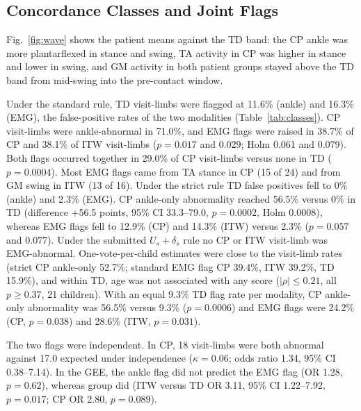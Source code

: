 \documentclass[conference]{IEEEtran}
\newcommand{\rtwo}[1]{{\color{rII}#1}}
\newcommand{\rthree}[1]{{\color{rIII}#1}}
\newcommand{\rfour}[1]{{\color{rIV}#1}}
\newcommand{\rtwo}[1]{#1}
\newcommand{\rthree}[1]{#1}
\newcommand{\rfour}[1]{#1}
\begin{document}
\subsection{Concordance Classes and Joint Flags}
\rtwo{Fig.~\ref{fig:wave} shows the patient means against the TD band: the CP ankle was more plantarflexed in stance and swing, TA activity in CP was higher in stance and lower in swing, and GM activity in both patient groups stayed above the TD band from mid-swing into the pre-contact window.}

\rfour{Under the standard rule, TD visit-limbs were flagged at 11.6\% (ankle) and 16.3\% (EMG), the false-positive rates of the two modalities (Table~\ref{tab:classes}).} \rtwo{CP visit-limbs were ankle-abnormal in 71.0\%, and EMG flags were raised in 38.7\% of CP and 38.1\% of ITW visit-limbs ($p=0.017$ and $0.029$; Holm 0.061 and 0.079). Both flags occurred together in 29.0\% of CP visit-limbs versus none in TD ($p=0.0004$). Most EMG flags came from TA stance in CP (15 of 24) and from GM swing in ITW (13 of 16).} \rthree{Under the strict rule TD false positives fell to 0\% (ankle) and 2.3\% (EMG).} CP ankle-only abnormality reached 56.5\% versus 0\% in TD (difference +56.5 points, 95\% CI 33.3--79.0, $p=0.0002$, Holm 0.0008), whereas EMG flags fell to 12.9\% (CP) and 14.3\% (ITW) versus 2.3\% ($p=0.057$ and $0.077$). \rtwo{Under the submitted $U_s+\delta_s$ rule no CP or ITW visit-limb was EMG-abnormal.} \rtwo{One-vote-per-child estimates were close to the visit-limb rates (strict CP ankle-only 52.7\%; standard EMG flag CP 39.4\%, ITW 39.2\%, TD 15.9\%), and within TD, age was not associated with any score ($|\rho|\le0.21$, all $p\ge0.37$, 21 children).} \rfour{With an equal 9.3\% TD flag rate per modality, CP ankle-only abnormality was 56.5\% versus 9.3\% ($p=0.0006$) and EMG flags were 24.2\% (CP, $p=0.038$) and 28.6\% (ITW, $p=0.031$).}

\begin{table}[t]
\centering
\caption{Concordance classes and flags (\% of visit-limbs, 95\% child-bootstrap CI). $n$: visit-limbs/children. Std.: score $>U_s$; Strict: score $>U_s+m_s$. \rthree{Timing flag: Section~III-E.} \rtwo{Rounded classes may not sum to 100}}
\label{tab:classes}
\scriptsize
\setlength{\tabcolsep}{2.2pt}
\resizebox{\columnwidth}{!}{\rtwo{}}
\end{table}

\rtwo{The two flags were independent. In CP, 18 visit-limbs were both abnormal against 17.0 expected under independence ($\kappa=0.06$; odds ratio 1.34, 95\% CI 0.38--7.14). In the GEE, the ankle flag did not predict the EMG flag (OR 1.28, $p=0.62$), whereas group did (ITW versus TD OR 3.11, 95\% CI 1.22--7.92, $p=0.017$; CP OR 2.80, $p=0.089$).}
\end{document}

